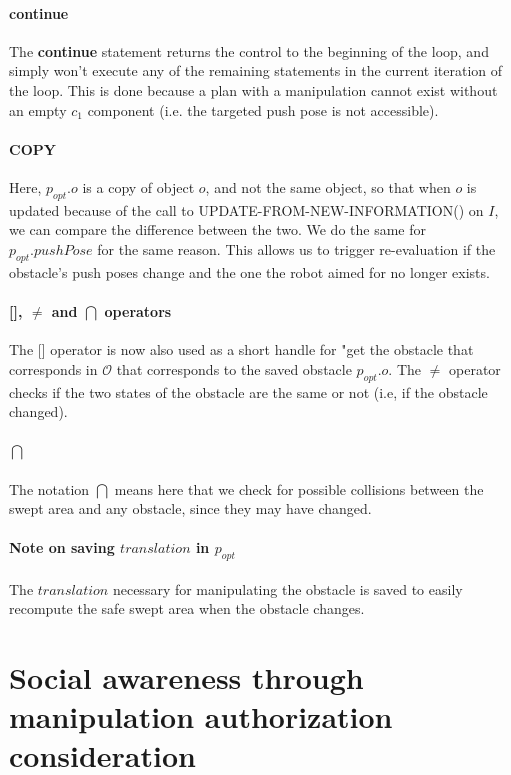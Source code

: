\paragraph{\textbf{continue}}\label{continue_note} The \textbf{continue} statement returns the control to the beginning of the loop, and simply won't execute any of the remaining statements in the current iteration of the loop. This is done because a plan with a manipulation cannot exist without an empty $c_{1}$ component (i.e. the targeted push pose is not accessible).

\paragraph{COPY}\label{copy_note} Here, $p_{opt}.o$ is a copy of object $o$, and not the same object, so that when $o$ is updated because of the call to UPDATE-FROM-NEW-INFORMATION() on $I$, we can compare the difference between the two. We do the same for $p_{opt}.pushPose$ for the same reason. This allows us to trigger re-evaluation if the obstacle's push poses change and the one the robot aimed for no longer exists.

\paragraph{[], $\neq$ and $\bigcap$ operators}\label{operators_note} The [] operator is now also used as a short handle for "get the obstacle that corresponds in $\mathcal{O}$ that corresponds to the saved obstacle $p_{opt}.o$. The $\neq$ operator checks if the two states of the obstacle are the same or not (i.e, if the obstacle changed).

\paragraph{$\bigcap$}\label{area_intersect_note} The notation $\bigcap$ means here that we check for possible collisions between the swept area and any obstacle, since they may have changed.

\paragraph{Note on saving $translation$ in $p_{opt}$}\label{translation_note} The $translation$ necessary for manipulating the obstacle is saved to easily recompute the safe swept area when the obstacle changes.

\section{Social awareness through manipulation authorization consideration}\label{social_authorization_section}

